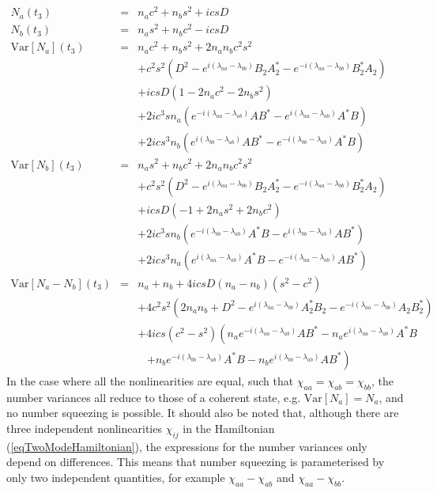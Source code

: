 \documentclass{iopart}
\begin{document}
\begin{eqnarray}
N_a(t_3) &=& n_a c^2 + n_b s^2 + i c s D \\
%
N_b(t_3) &=& n_a s^2 + n_b c^2 - i c s D \\
%
{\mathrm{Var}} [ N_a](t_3) &=& n_a c^2 + n_b s^2 + 2 n_a n_b c^2 s^2 \nonumber\\
       && + c^2 s^2 (D^2 - e^{i(\lambda_{aa} - \lambda_{bb})} B_2 A_2^* - e^{-i(\lambda_{aa} - \lambda_{bb})} B_2^* A_2) \nonumber \\
       && + i c s D (1-2 n_a c^2 -2 n_b s^2)  \nonumber\\
       && + 2 i c^3 s n_a (e^{-i(\lambda_{aa} - \lambda_{ab})} A B^* - e^{i(\lambda_{aa} - \lambda_{ab})} A^* B ) \nonumber \\
       && + 2 i c s^3 n_b (e^{i(\lambda_{bb} - \lambda_{ab})} A B^* - e^{-i(\lambda_{bb} - \lambda_{ab})} A^* B ) \\
%
{\mathrm{Var}} [ N_b](t_3) &=&  n_a s^2 + n_b c^2 + 2 n_a n_b c^2 s^2 \nonumber \\
       && + c^2 s^2 (D^2 - e^{i(\lambda_{aa} - \lambda_{bb})} B_2 A_2^* - e^{-i(\lambda_{aa} - \lambda_{bb})} B_2^* A_2 ) \nonumber \\
       && + i c s D (-1+2 n_a s^2 + 2 n_b c^2)  \nonumber \\
       && + 2 i c^3 s n_b (e^{-i(\lambda_{bb} - \lambda_{ab})} A^* B - e^{i(\lambda_{bb} - \lambda_{ab})} A B^* ) \nonumber \\
       && + 2 i c s^3 n_a (e^{i(\lambda_{aa} - \lambda_{ab})} A^* B - e^{-i(\lambda_{aa} - \lambda_{ab})} A B^* ) \\
%
{\mathrm{Var}} [ N_a - N_b](t_3) &=& n_a + n_b + 4 i c s D (n_a - n_b)(s^2 - c^2) \nonumber \\
       && + 4 c^2 s^2 (2 n_a n_b +D^2 - e^{i(\lambda_{aa} - \lambda_{bb})} A_2^* B_2 - e^{-i(\lambda_{aa} - \lambda_{bb})} A_2 B_2^* ) \nonumber \\
       && + 4 i c s (c^2 - s^2) \left( n_a e^{-i(\lambda_{aa} - \lambda_{ab})} A B^* - n_a e^{i(\lambda_{aa} - \lambda_{ab})} A^* B \right. \nonumber \\
       && \,\,\,\,\, \left. + n_b e^{-i(\lambda_{bb} - \lambda_{ab})} A^* B - n_b e^{i(\lambda_{bb} - \lambda_{ab})} A B^* \right) \label{eqNumDiffVariance}
\end{eqnarray}
In the case where all the nonlinearities are equal, such that $\chi_{aa} = \chi_{ab} = \chi_{bb}$, the number variances all reduce to those of a coherent state, e.g. ${\mathrm{Var}}[N_a]=N_a$, and no number squeezing is possible. It should also be noted that, although there are three independent nonlinearities $\chi_{ij}$ in the Hamiltonian (\ref{eqTwoModeHamiltonian}), the expressions for the number variances only depend on differences. This means that number squeezing is parameterised by only two independent quantities, for example $\chi_{aa}-\chi_{ab}$ and $\chi_{aa}-\chi_{bb}$.  
\end{document}
